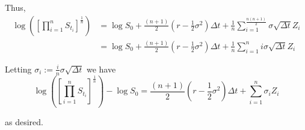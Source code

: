 \documentclass[12pt]{article}
\begin{document}
Thus,
\begin{align*}
	\log \left( \left[ \prod^n_{i = 1} S_{t_i} \right]^\frac{1}{n} \right) &= \log S_0 + \frac{ (n + 1) }{2}\left( r - \frac{1}{2}\sigma^2 \right)\Delta t + \frac{1}{n} \sum^\frac{n(n + 1)}{2}_{i = 1} \sigma\sqrt{\Delta t} Z_i \\
	&= \log S_0 + \frac{ (n + 1) }{2}\left( r - \frac{1}{2}\sigma^2 \right)\Delta t + \frac{1}{n} \sum^n_{i = 1} i\sigma\sqrt{\Delta t} Z_i 
\end{align*}

Letting $\sigma_i := \frac{i}{n}\sigma\sqrt{\Delta t}$ we have
\begin{equation*}
	\log \left( \left[ \prod^n_{i = 1} S_{t_i} \right]^\frac{1}{n} \right) - \log S_0 = \frac{ (n + 1) }{2}\left( r - \frac{1}{2}\sigma^2 \right)\Delta t + \sum^n_{i = 1} \sigma_i Z_i
\end{equation*}

as desired.
\end{document}

